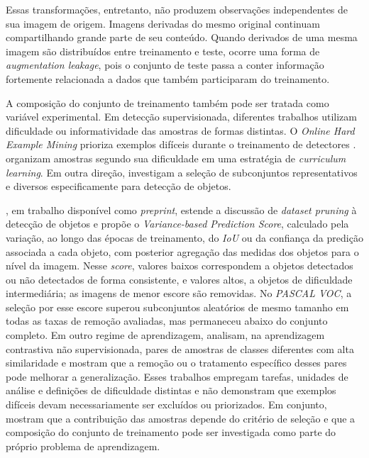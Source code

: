 Essas transforma\c{c}\~oes, entretanto, n\~ao produzem observa\c{c}\~oes independentes de sua imagem de origem. Imagens derivadas do mesmo original continuam compartilhando grande parte de seu conte\'udo. Quando derivados de uma mesma imagem s\~ao distribu\'idos entre treinamento e teste, ocorre uma forma de \textit{augmentation leakage}, pois o conjunto de teste passa a conter informa\c{c}\~ao fortemente relacionada a dados que tamb\'em participaram do treinamento.

A composi\c{c}\~ao do conjunto de treinamento tamb\'em pode ser tratada como vari\'avel experimental. Em detec\c{c}\~ao supervisionada, diferentes trabalhos utilizam dificuldade ou informatividade das amostras de formas distintas. O \textit{Online Hard Example Mining} prioriza exemplos dif\'iceis durante o treinamento de detectores \citep{shrivastava2016}. \citet{wang2018} organizam amostras segundo sua dificuldade em uma estrat\'egia de \textit{curriculum learning}. Em outra dire\c{c}\~ao, \citet{lee2024} investigam a sele\c{c}\~ao de subconjuntos representativos e diversos especificamente para detec\c{c}\~ao de objetos.

\citet{yagi2025}, em trabalho dispon\'ivel como \textit{preprint}, estende a discuss\~ao de \textit{dataset pruning} \`a detec\c{c}\~ao de objetos e prop\~oe o \textit{Variance-based Prediction Score}, calculado pela varia\c{c}\~ao, ao longo das \'epocas de treinamento, do \textit{IoU} ou da confian\c{c}a da predi\c{c}\~ao associada a cada objeto, com posterior agrega\c{c}\~ao das medidas dos objetos para o n\'ivel da imagem. Nesse \textit{score}, valores baixos correspondem a objetos detectados ou n\~ao detectados de forma consistente, e valores altos, a objetos de dificuldade intermedi\'aria; as imagens de menor escore s\~ao removidas. No \textit{PASCAL VOC}, a sele\c{c}\~ao por esse escore superou subconjuntos aleat\'orios de mesmo tamanho em todas as taxas de remo\c{c}\~ao avaliadas, mas permaneceu abaixo do conjunto completo. Em outro regime de aprendizagem, \citet{zhang2026} analisam, na aprendizagem contrastiva n\~ao supervisionada, pares de amostras de classes diferentes com alta similaridade e mostram que a remo\c{c}\~ao ou o tratamento espec\'ifico desses pares pode melhorar a generaliza\c{c}\~ao. Esses trabalhos empregam tarefas, unidades de an\'alise e defini\c{c}\~oes de dificuldade distintas e n\~ao demonstram que exemplos dif\'iceis devam necessariamente ser exclu\'idos ou priorizados. Em conjunto, mostram que a contribui\c{c}\~ao das amostras depende do crit\'erio de sele\c{c}\~ao e que a composi\c{c}\~ao do conjunto de treinamento pode ser investigada como parte do pr\'oprio problema de aprendizagem.


